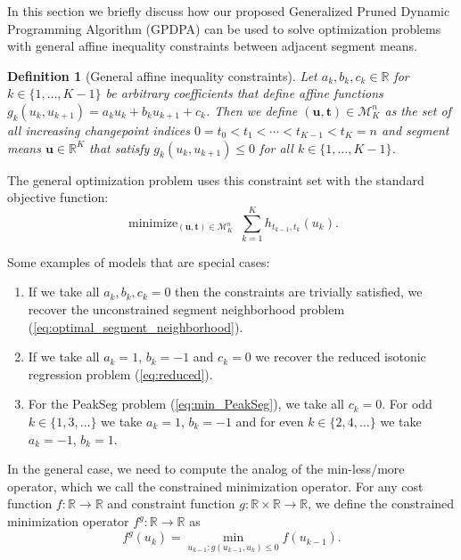 \documentclass{article}
\newtheorem{definition}{Definition}
\DeclareMathOperator*{\minimize}{minimize}
\newcommand{\RR}{\mathbb R}
\begin{document}
In this section we briefly discuss how our proposed Generalized Pruned
Dynamic Programming Algorithm (GPDPA) can be used to solve
optimization problems with general affine inequality constraints
between adjacent segment means.

\begin{definition}[General affine inequality constraints]
\label{def:affine-inequality-constraints}
  Let $a_k,b_k,c_k\in\RR$ for $k\in\{1,\dots,K-1\}$ be arbitrary
  coefficients that define affine functions
  $g_k(u_k, u_{k+1})=a_k u_k + b_k u_{k+1} + c_k$. Then we define
  $(\mathbf u, \mathbf t)\in\mathcal M^n_K$ as the set of all
  increasing changepoint indices $0=t_0<t_1<\cdots<t_{K-1}<t_K=n$ and
  segment means $\mathbf u\in\RR^K$ that satisfy
  $g_k(u_k, u_{k+1}) \leq 0$ for all $k\in\{1,\dots, K-1\}$.
\end{definition}
The general optimization problem uses this constraint set with the
standard objective function:
\begin{equation}
  \label{eq:min_general_affine_inequality}
    \minimize_{
        (\mathbf u, \mathbf t)\in\mathcal M^n_K
      } \ 
\sum_{k=1}^K h_{t_{k-1}, t_k}(u_k).
\end{equation}

Some examples of models that are special cases:
\begin{enumerate}
\item If we take all $a_k,b_k,c_k=0$ then the constraints are
  trivially satisfied, we
  recover the unconstrained segment neighborhood problem
  (\ref{eq:optimal_segment_neighborhood}).
\item If we take all $a_{k} =1$, $b_{k}=-1$ and $c_{k} = 0$ we recover
  the reduced isotonic regression problem
  (\ref{eq:reduced}).
\item For the PeakSeg problem (\ref{eq:min_PeakSeg}),
  we take all $c_{k} = 0$. For odd $k\in\{1,3,\dots\}$ we take
  $a_{k} =1$, $b_{k}=-1$ and for even $k\in\{2,4,\dots\}$ we take
  $a_{k} =-1$, $b_{k}=1$.
\end{enumerate}

In the general case, we need to compute the analog of the
min-less/more operator, which we call the constrained minimization
operator. For any cost function $f:\RR\rightarrow\RR$ and constraint
function $g:\RR\times\RR\rightarrow\RR$, we define the constrained
minimization operator $f^g:\RR\rightarrow\RR$ as
\begin{equation}
  \label{eq:constrained-min-operator}
  f^g(u_{k}) = \min_{u_{k-1} : g(u_{k-1}, u_{k})\leq 0} f(u_{k-1}).
\end{equation}
\end{document}
